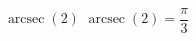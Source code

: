  {$\operatorname{arcsec} \left( 2 \right)$}
{ $\operatorname{arcsec} \left( 2 \right) = \dfrac{\pi}{3}$}
